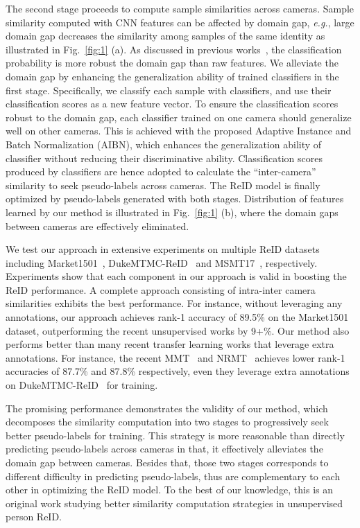 \documentclass[final]{cvpr}
\begin{document}
The second stage proceeds to compute sample similarities across cameras. Sample similarity computed with CNN features can be affected by domain gap, \emph{e.g.}, large domain gap decreases the similarity among samples of the same identity as illustrated in Fig.~\ref{fig:1} (a). As discussed in previous works~\cite{dou2019domain, tzeng2015simultaneous}, the classification probability is more robust the domain gap than raw features. We alleviate the domain gap by enhancing the generalization ability of trained classifiers in the first stage. Specifically, we classify each sample with  classifiers, and use their classification scores as a new feature vector. To ensure the classification scores robust to the domain gap, each classifier trained on one camera should generalize well on other cameras. This is achieved with the proposed Adaptive Instance and Batch Normalization (AIBN), which enhances the generalization ability of classifier without reducing their discriminative ability. Classification scores produced by  classifiers are hence adopted to calculate the ``inter-camera'' similarity to seek pseudo-labels across cameras. The ReID model is finally optimized by pseudo-labels generated with both stages. Distribution of features learned by our method is illustrated in Fig.~\ref{fig:1} (b), where the domain gaps between cameras are effectively eliminated.

We test our approach in extensive experiments on multiple ReID datasets including Market1501~\cite{market1501}, DukeMTMC-ReID~\cite{dukemtmc} and MSMT17~\cite{PTGan}, respectively. Experiments show that each component in our approach is valid in boosting the ReID performance. A complete approach consisting of intra-inter camera similarities exhibits the best performance. For instance, without leveraging any annotations, our approach achieves rank-1 accuracy of 89.5\% on the Market1501 dataset, outperforming the recent unsupervised works by 9+\%. Our method also performs better than many recent transfer learning works that leverage extra annotations. For instance, the recent MMT~\cite{MMT} and NRMT~\cite{zhao2020unsupervised} achieves lower rank-1 accuracies of 87.7\% and 87.8\% respectively, even they leverage extra annotations on DukeMTMC-ReID~\cite{dukemtmc} for training.

The promising performance demonstrates the validity of our method, which decomposes the similarity computation into two stages to progressively seek better pseudo-labels for training. This strategy is more reasonable than directly predicting pseudo-labels across cameras in that, it effectively alleviates the domain gap between cameras. Besides that, those two stages corresponds to different difficulty in predicting pseudo-labels, thus are complementary to each other in optimizing the ReID model. To the best of our knowledge, this is an original work studying better similarity computation strategies in unsupervised person ReID.
\end{document}
